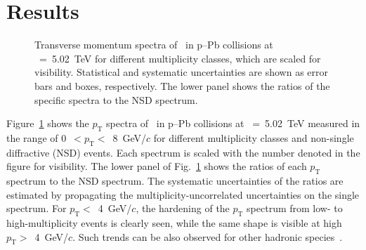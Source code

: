 
\section {Results}
\label{sec:results}

\begin{figure}[!hbt]
	\centering
	\caption{ Transverse momentum spectra of \fzero~in p--Pb collisions at \snn~=~5.02~TeV for different multiplicity classes, which are scaled for visibility. Statistical and systematic uncertainties are shown as error bars and boxes, respectively. The lower panel shows the ratios of the specific spectra to the NSD spectrum. }
	\label{fig:pt}
\end{figure}

Figure~\ref{fig:pt} shows the $p_{\mathrm{T}}$ spectra of \fzero~in p--Pb collisions at \snn~=~5.02~TeV measured in the range of 0~$<p_{\mathrm{T}}<$~8~GeV/$c$ for different multiplicity classes and non-single diffractive (NSD) events. Each spectrum is scaled with the number denoted in the figure for visibility. The lower panel of Fig.~\ref{fig:pt} shows the ratios of each $p_{\mathrm{T}}$ spectrum to the NSD spectrum. The systematic uncertainties of the ratios are estimated by propagating the multiplicity-uncorrelated uncertainties on the single spectrum. For $p_{\mathrm{T}}<$~4~GeV/$c$, the hardening of the $p_{\mathrm{T}}$ spectrum from low- to high-multiplicity events is clearly seen, while the same shape is visible at high $p_{\mathrm{T}}>$~4~GeV/$c$. Such trends can be also observed for other hadronic species~\cite{Tsallis:1987eu}.


